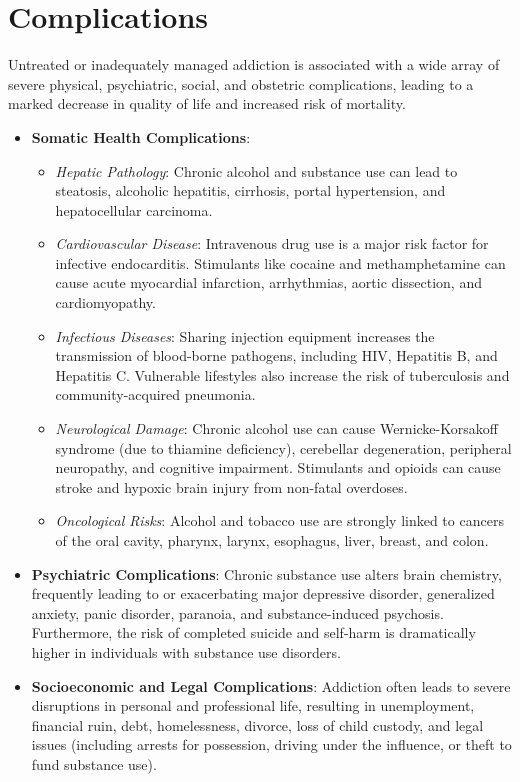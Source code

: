 \section*{Complications}
Untreated or inadequately managed addiction is associated with a wide array of severe physical, psychiatric, social, and obstetric complications, leading to a marked decrease in quality of life and increased risk of mortality.
\begin{itemize}
    \item \textbf{Somatic Health Complications}:
    \begin{itemize}
        \item \textit{Hepatic Pathology}: Chronic alcohol and substance use can lead to steatosis, alcoholic hepatitis, cirrhosis, portal hypertension, and hepatocellular carcinoma.
        \item \textit{Cardiovascular Disease}: Intravenous drug use is a major risk factor for infective endocarditis. Stimulants like cocaine and methamphetamine can cause acute myocardial infarction, arrhythmias, aortic dissection, and cardiomyopathy.
        \item \textit{Infectious Diseases}: Sharing injection equipment increases the transmission of blood-borne pathogens, including HIV, Hepatitis B, and Hepatitis C. Vulnerable lifestyles also increase the risk of tuberculosis and community-acquired pneumonia.
        \item \textit{Neurological Damage}: Chronic alcohol use can cause Wernicke-Korsakoff syndrome (due to thiamine deficiency), cerebellar degeneration, peripheral neuropathy, and cognitive impairment. Stimulants and opioids can cause stroke and hypoxic brain injury from non-fatal overdoses.
        \item \textit{Oncological Risks}: Alcohol and tobacco use are strongly linked to cancers of the oral cavity, pharynx, larynx, esophagus, liver, breast, and colon.
    \end{itemize}
    \item \textbf{Psychiatric Complications}: Chronic substance use alters brain chemistry, frequently leading to or exacerbating major depressive disorder, generalized anxiety, panic disorder, paranoia, and substance-induced psychosis. Furthermore, the risk of completed suicide and self-harm is dramatically higher in individuals with substance use disorders.
    \item \textbf{Socioeconomic and Legal Complications}: Addiction often leads to severe disruptions in personal and professional life, resulting in unemployment, financial ruin, debt, homelessness, divorce, loss of child custody, and legal issues (including arrests for possession, driving under the influence, or theft to fund substance use).

\end{itemize}
